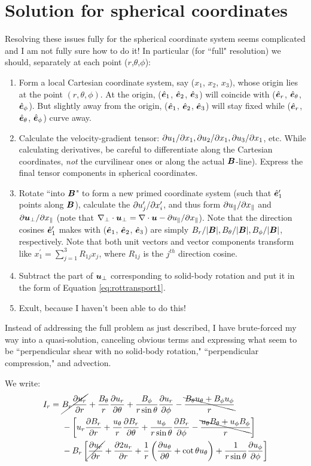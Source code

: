 \documentclass[12pt]{article}
\newcommand{\xpar}{x_\parallel}
\newcommand{\upar}{u_\parallel}
\newcommand{\uperp}{\vecu_\perp}
\begin{document}
\section{Solution for spherical coordinates}
Resolving these issues fully for the spherical coordinate system seems complicated and I am not fully sure how to do it! In particular (for ``full" resolution) we should, separately at each point ($r$,$\theta$,$\phi$):
\begin{enumerate}
	\item Form a local Cartesian coordinate system, say ($x_1$, $x_2$, $x_3$), whose origin lies at the point $(r,\theta,\phi)$. At the origin, ($\hat{\bm{e}}_1$, $\hat{\bm{e}}_2$, $\hat{\bm{e}}_3$) will coincide with ($\hat{\bm{e}}_r$, $\hat{\bm{e}}_\theta$, $\hat{\bm{e}}_\phi$). But slightly away from the origin, ($\hat{\bm{e}}_1$, $\hat{\bm{e}}_2$, $\hat{\bm{e}}_3$) will stay fixed while ($\hat{\bm{e}}_r$, $\hat{\bm{e}}_\theta$, $\hat{\bm{e}}_\phi$) curve away. 
	\item Calculate the velocity-gradient tensor: $\partial u_1/\partial x_1,\partial u_2/\partial x_1, \partial u_3/\partial x_1$, etc. While calculating derivatives, be careful to differentiate along the Cartesian coordinates, \textit{not} the curvilinear ones or along the actual $\bm{B}$-line). Express the final tensor components in spherical coordinates.
	\item Rotate ``into $\bm{B}$" to form a new primed coordinate system (such that $\hat{\bm{e}}_1^\prime$ points along $\bm{B}$), calculate the $\partial u_j^\prime/\partial x_i^\prime$, and thus form $\pderivline{\upar}{\xpar}$ and $\pderivline{\uperp}{\xpar}$ (note that $\nabla_\perp\cdot\uperp=\Div\vecu- \pderivline{\upar}{\xpar}$). Note that the direction cosines $\hat{\bm{e}}_1^\prime$ makes with ($\hat{\bm{e}}_1$, $\hat{\bm{e}}_2$, $\hat{\bm{e}}_3$) are simply $B_r/|\bm{B}|, B_\theta/|\bm{B}|, B_\phi/|\bm{B}|$, respectively. Note that both unit vectors and vector components transform like $x_1^\prime=\sum_{j=1}^3R_{1j}x_j$, where $R_{1j}$ is the $j^{th}$ direction cosine.  
	\item Subtract the part of $\uperp$ corresponding to solid-body rotation and put it in the form of Equation \eqref{eq:rottransport1}. 
	\item Exult, because I haven't been able to do this!
\end{enumerate}
Instead of addressing the full problem as just described, I have brute-forced my way into a quasi-solution, canceling obvious terms and expressing what seem to be ``perpendicular shear with no solid-body rotation," ``perpendicular compression," and advection. 

We write:
\begin{align*}
	I_r =\ &\cancel{\br\pderiv{\ur}{r}}   +   \frac{\bt}{r}\pderiv{\ur}{\theta}   +   \frac{\bp}{\rsint}\pderiv{\ur}{\phi}   -   \bcancel{    \frac{\bt\ut+\bp\up}{r}   }\\
	&-\left[   \ur\pderiv{\br}{r}   +   \frac{\ut}{r}\pderiv{\br}{\theta}   +   \frac{\up}{\rsint}\pderiv{\br}{\phi}   -   \bcancel{    \frac{\ut\bt+\up\bp}{r}   }   \right]\\
	&- B_r\left[   \cancel{\pderiv{\ur}{r}}   +    \pderiv{2\ur}{r}   +   \frac{1}{r}\left(  \pderiv{\ut}{\theta}  + \cot\theta\ut  \right)   +   \orsint\pderiv{\up}{\phi}   \right]
\end{align*}
\end{document}
